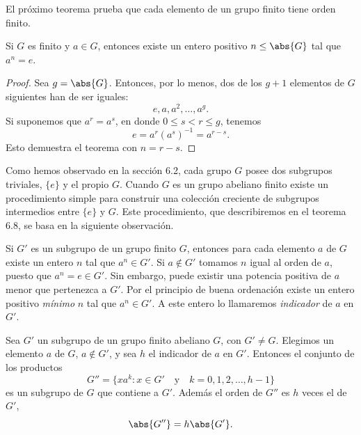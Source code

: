 \documentclass[12pt,a4paper]{book}
\begin{document}
    El próximo teorema prueba que cada elemento de un grupo finito tiene orden finito.

    \begin{teorema}
        Si $G$ es finito y $a\in G$, entonces existe un entero positivo $n\leq\abs{G}$ tal
        que $a^{n}=e$.
    \end{teorema}

    \begin{proof}
        Sea $g=\abs{G}$. Entonces, por lo menos, dos de los $g+1$ elementos de $G$
        siguientes han de ser iguales:
        \begin{equation*}
            e,a,a^{2},\dots,a^{g}.
        \end{equation*}
        Si suponemos que $a^{r}=a^{s}$, en donde $0\leq s<r\leq g$, tenemos
        \begin{equation*}
            e=a^{r}(a^{s})^{-1}=a^{r-s}.
        \end{equation*}
        Esto demuestra el teorema con $n=r-s$.
    \end{proof}

    Como hemos observado en la sección 6.2, cada grupo $G$ posee dos subgrupos triviales,
    $\{e\}$ y el propio $G$. Cuando $G$ es un grupo abeliano finito existe un procedimiento
    simple para construir una colección creciente de subgrupos intermedios entre $\{e\}$ y
    $G$. Este procedimiento, que describiremos en el teorema 6.8, se basa en la siguiente
    observación.

    Si $G'$ es un subgrupo de un grupo finito $G$, entonces para cada elemento $a$ de $G$
    existe un entero $n$ tal que $a^{n}\in G'$. Si $a\notin G'$ tomamos $n$ igual al orden de
    $a$, puesto que $a^{n}=e\in G'$. Sin embargo, puede existir una potencia positiva de $a$
    menor que pertenezca a $G'$. Por el principio de buena ordenación existe un entero
    positivo \textit{mínimo} $n$ tal que $a^{n}\in G'$. A este entero lo llamaremos
    \textit{indicador} de $a$ en $G'$.

    \begin{teorema}
        Sea $G'$ un subgrupo de un grupo finito abeliano $G$, con $G'\neq G$. Elegimos un
        elemento $a$ de $G$, $a\notin G'$, y sea $h$ el indicador de $a$ en $G'$. Entonces
        el conjunto de los productos
        \begin{equation*}
            G''=\{xa^{k}:x\in G'\quad\text{y}\quad k=0,1,2,\dots,h-1\}
        \end{equation*}
        es un subgrupo de $G$ que contiene a $G'$. Además el orden de $G''$ es $h$ veces el
        de $G'$,
        \begin{equation*}
            \abs{G''}=h\abs{G'}.
        \end{equation*}
    \end{teorema}
\end{document}
